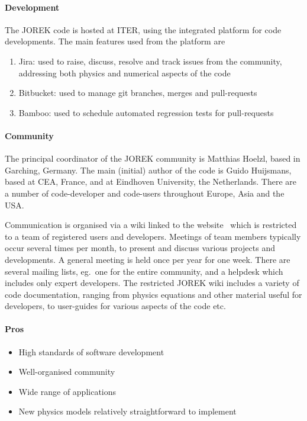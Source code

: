 \paragraph{Development}

The JOREK code is hosted at ITER, using the integrated platform for code 
developments. The main features used from the platform are
\begin{enumerate}
    \item Jira: used to raise, discuss, resolve and track issues from the 
community, addressing both physics and numerical aspects of the code
    \item Bitbucket: used to manage git branches, merges and pull-requests
    \item Bamboo: used to schedule automated regression tests for 
pull-requests
\end{enumerate}


\paragraph{Community}

The principal coordinator of the JOREK community is Matthias Hoelzl, based in 
Garching, Germany. The main (initial) author of the code is Guido Huijsmans, 
based at CEA, France, and at Eindhoven University, the Netherlands. There are a 
number of code-developer and code-users throughout Europe, Asia and the USA.

Communication is organised via a wiki linked to the 
website~\cite{JOREK} which is restricted to a team of registered users and developers.
Meetings of team members typically occur several times per month, to 
present and discuss various projects and developments. A general meeting is 
held once per year for one week. There are several mailing lists, eg.\ one for the 
entire community, and a helpdesk which includes only expert developers.
The restricted JOREK wiki includes a variety of code documentation, ranging from physics 
equations and other material useful for developers, to user-guides for various 
aspects of the code etc.


\paragraph{Pros}

\begin{itemize}
  \item High standards of software development
  \item Well-organised community
  \item Wide range of applications
  \item New physics models relatively straightforward to implement
\end{itemize}

